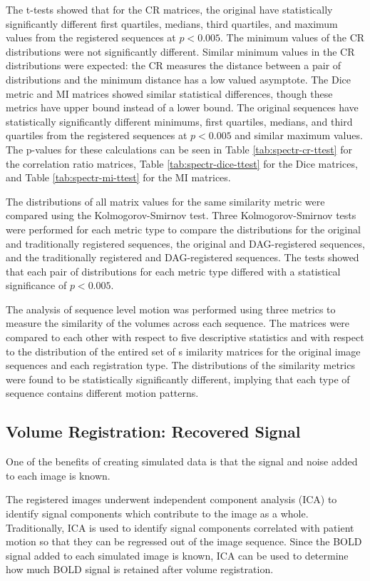 The t-tests showed that for the CR matrices, the original have statistically significantly different first quartiles, medians, third quartiles, and maximum values from the registered sequences at $p < 0.005$. The minimum values of the CR distributions were not significantly different. Similar minimum values in the CR distributions were expected: the CR measures the distance between a pair of distributions and the minimum distance has a low valued asymptote. The Dice metric and MI matrices showed similar statistical differences, though these metrics have upper bound instead of a lower bound. The original sequences have statistically significantly different minimums, first quartiles, medians, and third quartiles from the registered sequences at $p < 0.005$ and similar maximum values. The p-values for these calculations can be seen in Table \ref{tab:spectr-cr-ttest} for the correlation ratio matrices, Table \ref{tab:spectr-dice-ttest} for the Dice matrices, and Table \ref{tab:spectr-mi-ttest} for the MI matrices. 

The distributions of all matrix values for the same similarity metric were compared using the Kolmogorov-Smirnov test. Three Kolmogorov-Smirnov tests were performed for each metric type to compare the distributions for the original and traditionally registered sequences, the original and DAG-registered sequences, and the traditionally registered and DAG-registered sequences. The tests showed that each pair of distributions for each metric type differed with a statistical significance of $p < 0.005$.

The analysis of sequence level motion was performed using three metrics to measure the similarity of the volumes across each sequence. The matrices were compared to each other with respect to five descriptive statistics and with respect to the distribution of the entired set of s imilarity matrices for the original image sequences and each registration type. The distributions of the similarity metrics were found to be statistically significantly different, implying that each type of sequence contains different motion patterns.


\subsection{Volume Registration: Recovered Signal}

One of the benefits of creating simulated data is that the signal and noise added to each image is known. 

The registered images underwent independent component analysis (ICA) to identify signal components which contribute to the image as a whole. Traditionally, ICA is used to identify signal components correlated with patient motion so that they can be regressed out of the image sequence. Since the BOLD signal added to each simulated image is known, ICA can be used to determine how much BOLD signal is retained after volume registration.

